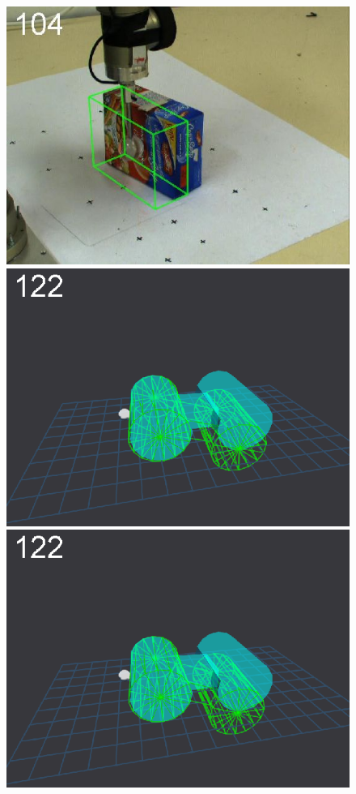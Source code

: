 \begin{figure}[t]
{\includegraphics[width=\imgCXwid]{images/C1_LWPR1_87_2}
\includegraphics[width=\imgCXwid]{images/C5_1exp_6_2}
\includegraphics[width=\imgCXwid]{images/C5_2exp_6_2}
}
\end{figure}
